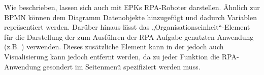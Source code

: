 Wie beschrieben, lassen sich auch mit EPKs RPA-Roboter darstellen. Ähnlich zur BPMN können dem Diagramm Datenobjekte hinzugefügt und dadurch Variablen repräsentiert werden. Darüber hinaus lässt das „Organisationseinheit“-Element für die Darstellung der zum Ausführen der RPA-Aufgabe genutzten Anwendung (z.B. ) verwenden. Dieses zusätzliche Element kann in der jedoch auch Visualisierung kann jedoch entfernt werden, da zu jeder Funktion die RPA-Anwendung gesondert im Seitenmenü spezifiziert werden muss.